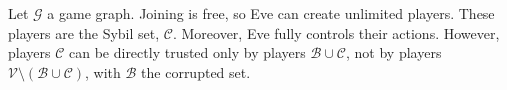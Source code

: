{}
\begin{definition}
  Let $\mathcal{G}$ a game graph. Joining is free, so Eve can create unlimited players. These players are the Sybil set,
  $\mathcal{C}$. Moreover, Eve fully controls their actions. However, players $\mathcal{C}$ can be directly trusted only by
  players $\mathcal{B} \cup \mathcal{C}$, not by players $\mathcal{V} \setminus (\mathcal{B} \cup \mathcal{C})$, with
  $\mathcal{B}$ the corrupted set.
\end{definition}
